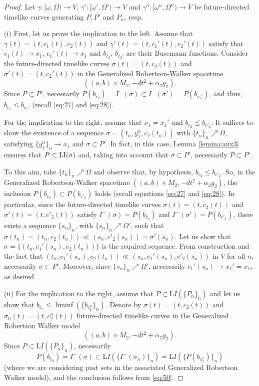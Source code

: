   \begin{proof} Let $\gamma:[\omega,\Omega)\rightarrow V$, $\gamma':[\omega',\Omega')\rightarrow V$ and $\gamma^n:[\omega^n,\Omega^n)\rightarrow V$ be future-directed timelike curves generating $P,P'$ and $P_n$, resp.

    (i) First, let us prove the implication to the left. Assume that $\gamma(t)=(t,c_1(t),c_2(t))$ and $\gamma'(t)=(t,c_1'(t),c_2'(t))$ satisfy that $c_{1}(t) \rightarrow x_{1}$, $c_{1}'(t) \rightarrow x_{1}$ and $b_{c_{2}}$, $b_{c_{2}'}$ are their Busemann functions. Consider the future-directed timelike curves $\sigma(t)=(t,c_2(t))$ and $\sigma'(t)=(t,c_2'(t))$ in the Generalized Robertson-Walker spacetime $$\left( (a,b)\times M_2,-dt^2+\alpha_2g_2\right).$$ Since $P\subset P'$, necessarily $P(b_{c_2})=I^-(\sigma)\subset I^-(\sigma')=P(b_{c_2'})$, and thus, $b_{c_2}\leq b_{c_2'}$ (recall \eqref{eq:27} and \eqref{eq:28}).

For the implication to the right, assume that $x_1=x_1'$ and $b_{c_2}\leq b_{c'_2}$. It suffices to show the existence of a sequence $\sigma=(t_n,y_1^n,c_2(t_n))$ with $\{t_n\}_n\nearrow \Omega$, satisfying $\{y_1^n\}_n\rightarrow x_1$ and $\sigma\subset P'$. In fact, in this case, Lemma \ref{lemma:aux3} ensures that $P\subset {\rm LI}(\sigma)$ and, taking into account that $\sigma\subset P'$, necessarily $P\subset P'$.

To this aim, take $\{t_n\}_n\nearrow \Omega$ and observe that, by hypothesis, $b_{c_2}\leq b_{c'_2}$. So, in the Generalized Robertson-Walker spacetime $\left( (a,b)\times M_2,-dt^2+{\alpha_2}g_2\right)$, the inclusion $P(b_{c_2})\subset P(b_{c'_2})$ holds (recall equations \eqref{eq:27} and \eqref{eq:28}). In particular, since the future-directed timelike curves $\sigma(t)=(t,c_2(t))$ and $\sigma'(t)=(t,c'_2(t))$ satisfy $I^-(\sigma)=P(b_{c_2})$ and $ I^-(\sigma')=P(b_{c'_2})$, there exists a sequence $\{s_n\}_n$, with $\{s_n\}_n\nearrow \Omega'$, such that
$\sigma(t_n)=(t_n,c_2(t_n))\ll (s_n,c'_2(s_n))=\sigma'(s_n)$. Let us show that $\sigma=\{(t_n,c_1'(s_n),c_2(t_n))\}$ is the required sequence. From construction and the fact that $(t_n,c_1'(s_n),c_2(t_n))\ll (s_n,c_1'(s_n),c'_2(s_n))$ in $V$ for all $n$, necessarily $\sigma\subset P'$. Moreover, since $\{s_n\}_n\nearrow \Omega'$, necessarily $c_1'(s_n)\rightarrow x_1'=x_1$, as desired.

\smallskip

(ii) For the implication to the right, assume that $P\subset {\mathrm LI}(\{P_n\}_n)$ and let us show that $b_{c_2}\leq \liminf (\{b_{c_2^n}\}_n)$. Denote by $\sigma(t)=(t,c_2(t))$ and $\sigma_n(t)=(t,c_2^n(t))$ future-directed timelike curves in the Generalized Robertson Walker model \[\left((a,b)\times M_2,-dt^2+ \alpha_2g_2\right).\] Since $P\subset {\mathrm LI}(\{P_n\}_n)$, necessarily
  \[
P(b_{c_2})=I^-(\sigma)\subset {\mathrm LI}(\{I^-(\sigma_n)\}_n)={\mathrm LI}(\{P(b_{c_2^n})\}_n)
    \]
(where we are considering past sets in the associated Generalized Robertson Walker model), and the conclusion follows from \eqref{eq:50}.


\end{proof}
